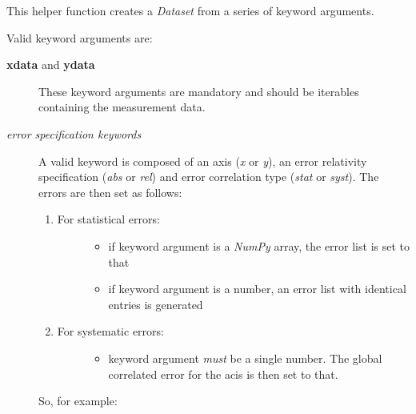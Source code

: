 \documentclass[letterpaper,10pt,english]{sphinxmanual}
\begin{document}
\begin{fulllineitems}
\label{api/kafe:kafe.dataset.build_dataset}
This helper function creates a \emph{Dataset} from a series of keyword arguments.

Valid keyword arguments are:
\begin{description}
\item[{\textbf{xdata} and \textbf{ydata}}] \leavevmode
These keyword arguments are mandatory and should be iterables containing the measurement data.

\item[{\emph{error specification keywords}}] \leavevmode
A valid keyword is composed of an axis (\emph{x} or \emph{y}), an error relativity specification (\emph{abs} or \emph{rel})
and error correlation type (\emph{stat} or \emph{syst}). The errors are then set as follows:
\begin{enumerate}
\item {} \begin{description}
\item[{For statistical errors:}] \leavevmode\begin{itemize}
\item {} 
if keyword argument is a \emph{NumPy} array, the error list is set to that

\item {} 
if keyword argument is a number, an error list with identical entries is generated

\end{itemize}

\end{description}

\item {} \begin{description}
\item[{For systematic errors:}] \leavevmode\begin{itemize}
\item {} 
keyword argument \emph{must} be a single number. The global correlated error for the acis is then set to that.

\end{itemize}

\end{description}

\end{enumerate}

So, for example:


\end{description}
\end{fulllineitems}
\end{document}
